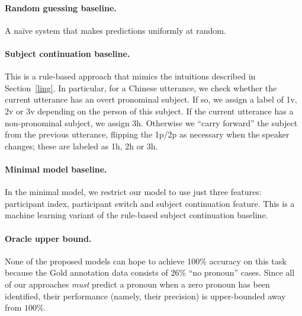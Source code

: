 \documentclass[11pt]{report}
\begin{document}
\paragraph{Random guessing baseline.}
A na\"ive system that makes predictions uniformly at random.

\paragraph{Subject continuation baseline.}
This is a rule-based approach that mimics the intuitions described in Section~\ref{ling}. In particular, for a Chinese utterance, we check whether the current utterance has an overt pronominal subject. If so, we assign a label of 1v, 2v or 3v depending on the person of this subject. If the current utterance has a non-pronominal subject, we assign 3h. Otherwise we ``carry forward'' the subject from the previous utterance, flipping the 1p/2p as necessary when the speaker changes; these are labeled as 1h, 2h or 3h.

\paragraph{Minimal model baseline.}
In the minimal model, we restrict our model to use just three features: participant index, participant switch and subject continuation feature. This is a machine learning variant of the rule-based subject continuation baseline.

\paragraph{Oracle upper bound.}
None of the proposed models can hope to achieve 100\% accuracy on this task because the Gold annotation data consists of $26\%$ ``no pronoun'' cases. Since all of our approaches \emph{must} predict a pronoun when a zero pronoun has been identified, their performance (namely, their precision) is upper-bounded away from $100\%$. 
\end{document}
